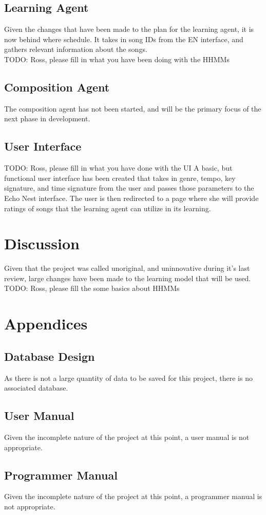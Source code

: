 \documentclass{article}
\begin{document}
\subsection{Learning Agent}
Given the changes that have been made to the plan for the learning agent, it is now behind where schedule.
It takes in song IDs from the EN interface, and gathers relevant information about the songs.
\\
\Large{TODO: Ross, please fill in what you have been doing with the HHMMs}

\subsection{Composition Agent}
The composition agent has not been started, and will be the primary focus of the next phase in development.

\subsection{User Interface}
\Large{TODO: Ross, please fill in what you have done with the UI}
A basic, but functional user interface has been created that takes in genre, tempo, key signature, and time
signature from the user and passes those parameters to the Echo Nest interface. The user is then redirected
to a page where she will provide ratings of songs that the learning agent can utilize in its learning.

\section{Discussion}
Given that the project was called unoriginal, and uninnovative during it's last review, large changes have been
 made to the learning model that will be used. \Large{TODO: Ross, please fill the some basics about HHMMs}

\newpage

\section{Appendices}
\subsection{Database Design}
As there is not a large quantity of data to be saved for this project, there is no associated 
database.

\subsection{User Manual}
Given the incomplete nature of the project at this point, a user manual is not appropriate.

\subsection{Programmer Manual}
Given the incomplete nature of the project at this point, a programmer manual is not appropriate.

\newpage





\end{document}

